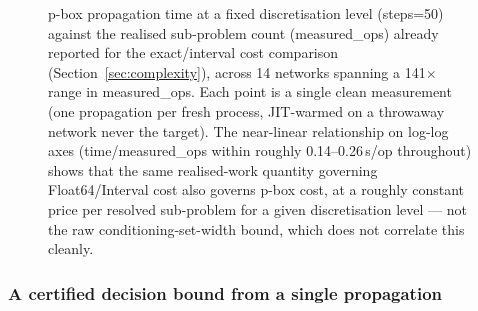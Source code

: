 \documentclass[preprint,12pt]{elsarticle}
\theoremstyle{definition}
\begin{document}
\begin{figure}[t]\centering
{}
\caption{p-box propagation time at a fixed discretisation level (steps=50) against the realised
sub-problem count (measured\_ops) already reported for the exact/interval cost comparison
(Section~\ref{sec:complexity}), across 14 networks spanning a 141$\times$ range in measured\_ops.
Each point is a single clean measurement (one propagation per fresh process, JIT-warmed on a
throwaway network never the target). The near-linear relationship on log-log axes
(time/measured\_ops within roughly 0.14--0.26\,s/op throughout) shows that the same realised-work
quantity governing Float64/Interval cost also governs p-box cost, at a roughly constant price per
resolved sub-problem for a given discretisation level --- not the raw conditioning-set-width bound,
which does not correlate this cleanly.}
\label{fig:pbox_cost}
\end{figure}

\subsubsection{A certified decision bound from a single propagation}\label{sec:certified}
\end{document}
